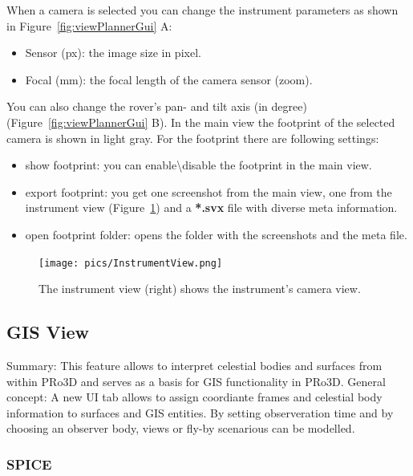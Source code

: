 When a camera is selected you can change the instrument parameters as shown in Figure~\ref{fig:viewPlannerGui} A:
\begin{itemize}
	\item Sensor (px): the image size in pixel.
	\item Focal (mm): the focal length of the camera sensor (zoom).
\end{itemize}
You can also change the rover's pan- and tilt axis (in degree) (Figure~\ref{fig:viewPlannerGui} B).
In the main view the footprint of the selected camera is shown in light gray. For the footprint there are following settings:
\begin{itemize}
	\item show footprint: you can enable\textbackslash disable the footprint in the main view.
	\item export footprint: you get one screenshot from the main view, one from the instrument view (Figure~\ref{fig:instView}) and a \textbf{*.svx} file with diverse meta information.
	\item open footprint folder: opens the folder with the screenshots and the meta file.
\end{itemize}
\begin{figure}[h]
    	\centering
    		\texttt{[image: pics/InstrumentView.png]}
    	\caption[Instrument View]{The instrument view (right) shows the instrument's camera view.}
    	\label{fig:instView}
   \end{figure}

\newpage
\subsection{GIS View}
\label{sec:gisview}

   
Summary: This feature allows to interpret celestial bodies and surfaces
from within PRo3D and serves as a basis for GIS functionality in PRo3D.
General concept: A new UI tab allows to assign coordiante frames and
celestial body information to surfaces and GIS entities. By setting
observeration time and by choosing an observer body, views or fly-by
scenarious can be modelled.

\hypertarget{spice}{%
	\subsubsection{SPICE}\label{spice}}

